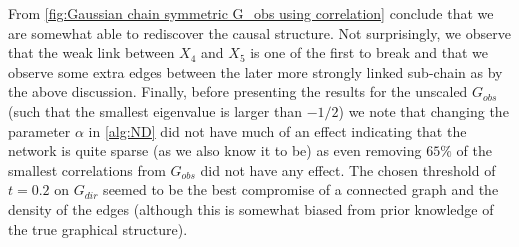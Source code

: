 \documentclass[../Thesis.tex]{subfiles}
\begin{document}
From \autoref{fig:Gaussian chain symmetric G_obs using correlation} conclude that we are somewhat able to rediscover the causal structure. Not surprisingly, we observe that the weak link between $X_4$ and $X_5$ is one of the first to break and that we observe some extra edges between the later more strongly linked sub-chain as by the above discussion. Finally, before presenting the results for the unscaled $G_{obs}$ (such that the smallest eigenvalue is larger than $-1/2$) we note that changing the parameter $\alpha$ in \autoref{alg:ND} did not have much of an effect indicating that the network is quite sparse (as we also know it to be) as even removing $65\%$ of the smallest correlations from $G_{obs}$ did not have any effect. The chosen threshold of $t=0.2$ on $G_{dir}$ seemed to be the best compromise of a connected graph and the density of the edges (although this is somewhat biased from prior knowledge of the true graphical structure).
\end{document}
